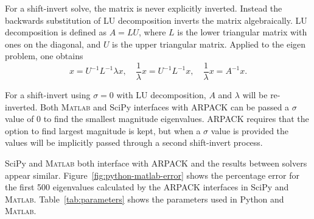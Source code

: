 For a shift-invert solve, the matrix is never explicitly inverted. Instead the backwards substitution of LU decomposition inverts the matrix algebraically. LU decomposition is defined as $A = LU$, where $L$ is the lower triangular matrix with ones on the diagonal, and $U$ is the upper triangular matrix. Applied to the eigen problem, one obtains
\[
x = U^{-1} L^{-1} \lambda x,\quad \frac{1}{\lambda} x = U^{-1}L^{-1} x,\quad \frac{1}{\lambda} x = A^{-1} x.
\]

For a shift-invert using $\sigma = 0$ with LU decomposition, $A$ and $\lambda$ will be re-inverted. Both M\textsc{atlab} and SciPy interfaces with ARPACK can be passed a $\sigma$ value of 0 to find the smallest magnitude eigenvalues. ARPACK requires that the option to find largest magnitude is kept, but when a $\sigma$ value is provided the values will be implicitly passed through a second shift-invert process.

SciPy and M\textsc{atlab} both interface with ARPACK and the results between solvers appear similar. Figure~\ref{fig:python-matlab-error} shows the percentage error for the first 500 eigenvalues calculated by the ARPACK interfaces in SciPy and M\textsc{atlab}. Table~\ref{tab:parameters} shows the parameters used in Python and M\textsc{atlab}.


